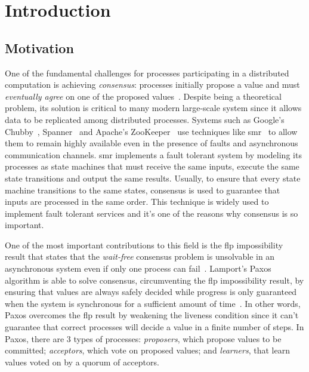 
\chapter{Introduction}
\section{Motivation}
One of the fundamental challenges for processes participating in a distributed computation is achieving \emph{consensus}: processes initially propose a value and must \emph{eventually agree} on one of the proposed values~\cite{vukolic2012quorum}. Despite being a theoretical problem, its solution is critical to many modern large-scale system since it allows data to be replicated among distributed processes. Systems such as Google's Chubby~\cite{Burrows2006}, Spanner~\cite{Corbett2012} and Apache's ZooKeeper~\cite{Hunt2010} use techniques like \acrfull{smr}~\cite{time-clocks,Schneider1990} to allow them to remain highly available even in the presence of faults and asynchronous communication channels. \acrshort{smr} implements a fault tolerant system by modeling its processes as state machines that must receive the same inputs, execute the same state transitions and output the same results. Usually, to ensure that every state machine transitions to the same states, consensus is used to guarantee that inputs are processed in the same order. This technique is widely used to implement fault tolerant services and it's one of the reasons why consensus is so important.\par
One of the most important contributions to this field is the \acrfull{flp} impossibility result that states that the \textit{wait-free} consensus problem is unsolvable in an asynchronous system even if only one process can fail~\cite{Fischer1985}. Lamport's Paxos algorithm is able to solve consensus, circumventing the \acrshort{flp} impossibility result, by ensuring that values are always safely decided while progress is only guaranteed when the system is synchronous for a sufficient amount of time~\cite{Lamport2001}. In other words, Paxos overcomes the \acrshort{flp} result by weakening the liveness condition since it can't guarantee that correct processes will decide a value in a finite number of steps. In Paxos, there are 3 types of processes: \textit{proposers}, which propose values to be committed; \textit{acceptors}, which vote on proposed values; and \textit{learners}, that learn values voted on by a quorum of acceptors.\par
